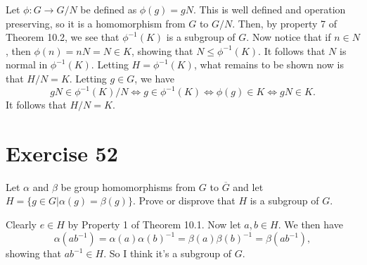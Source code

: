 \documentclass[12pt]{article}
\begin{document}
Let $\phi:G\to G/N$ be defined as $\phi(g)=gN$.  This is well defined
and operation preserving, so it is a homomorphism from $G$ to $G/N$.
Then, by property 7 of Theorem 10.2, we see that $\phi^{-1}(K)$ is a
subgroup of $G$.  Now notice that if $n\in N$, then $\phi(n)=nN=N\in K$,
showing that $N\leq\phi^{-1}(K)$.  It follows that $N$ is normal in $\phi^{-1}(K)$.
Letting $H=\phi^{-1}(K)$, what remains to be shown now is that $H/N=K$.  Letting $g\in G$, we have
\begin{equation*}
gN\in\phi^{-1}(K)/N\iff g\in\phi^{-1}(K)\iff\phi(g)\in K\iff gN\in K.
\end{equation*}
It follows that $H/N=K$.

\section*{Exercise 52}

Let $\alpha$ and $\beta$ be group homomorphisms from $G$ to $\overline{G}$ and let
$H=\{g\in G|\alpha(g)=\beta(g)\}$.  Prove or disprove that $H$ is a subgroup of $G$.

Clearly $e\in H$ by Property 1 of Theorem 10.1.
Now let $a,b\in H$.  We then have
\begin{equation*}
\alpha(ab^{-1})=\alpha(a)\alpha(b)^{-1}=\beta(a)\beta(b)^{-1}=\beta(ab^{-1}),
\end{equation*}
showing that $ab^{-1}\in H$.  So I think it's a subgroup of $G$.
\end{document}
